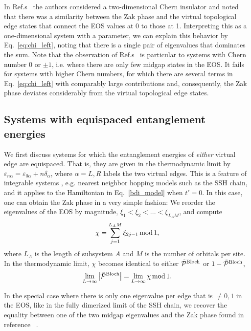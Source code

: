 \documentclass[twocolumn,amsmath,longbibliography,amssymb,superscriptaddress]{revtex4-1}
\begin{document}
In Ref.s~\cite{Huang2012,Huang2012-2} the authors considered a two-dimensional Chern insulator and noted that there was a similarity between the Zak phase and the virtual topological edge states that connect the EOS values at 0 to those at 1. 
Interpreting this as a one-dimensional system with a parameter, we can explain this behavior by Eq.~\eqref{eq:chi_left}, noting that there is a single pair of eigenvalues that dominates the sum. 
Note that the observation of Ref.s~\cite{Huang2012,Huang2012-2} is  particular to systems with Chern number 0 or $\pm 1$, i.e. where there are only few midgap states in the EOS. 
It fails for systems with higher Chern numbers,  for which there are several terms in Eq.~\eqref{eq:chi_left} with comparably large contributions and, consequently, the Zak phase deviates considerably from the virtual topological edge states.


\subsection{Systems with equispaced entanglement energies}

We first discuss systems for which the entanglement energies of \emph{either} virtual edge are equispaced. That is, they are given in the thermodynamic limit by $\varepsilon_{n\alpha} = \varepsilon_{0\alpha}+n\delta_\alpha$, where $\alpha = L,R$ labels the two virtual edges. 
This is a feature of integrable systems \cite{Peschel1999},  e.g. nearest neighbor hopping models such as the SSH chain, and it applies to the Hamiltonian in Eq.~\eqref{bdi_model} when $t'=0$. 
In this case, one can obtain the Zak phase in a very simple fashion: We reorder the eigenvalues of the EOS by magnitude, $\xi_1 < \xi_2 < ...< \xi_{L_AM}$, and compute
\begin{equation}
\chi = \sum_{j=1}^{L_A M} \xi_{2j-1} \, {\rm mod} \, 1,
\label{eq:chi_integrable}
\end{equation}
where $L_A$ is the length of subsystem $A$ and $M$ is the number of orbitals per site. In the thermodynamic limit, $\chi$ becomes identical to either $\tilde{\mathcal{P}}^{\rm Bloch}$ or $1-\tilde{\mathcal{P}}^{\rm Bloch}$, 
\begin{equation}
\lim_{L \rightarrow \infty} \abs{\tilde{\mathcal{P}}^{\rm Bloch}} = \lim_{L \rightarrow \infty} \chi \, {\rm mod} \, 1.
\end{equation}

In the special case where there is only one eigenvalue per edge that is $\neq 0,1$ in  the EOS, like in the fully dimerized limit of the SSH chain, we recover the equality between one of the two midgap eigenvalues and the Zak phase found in reference ~\cite{Ryu2006}. 
\end{document}
